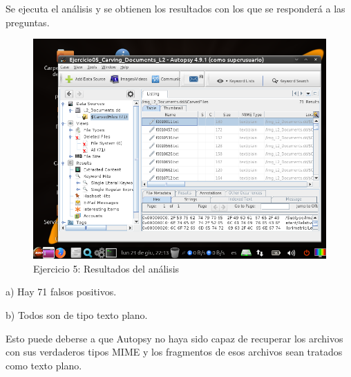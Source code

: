 \documentclass[11pt]{article}
\begin{document}
Se ejecuta el análisis y se obtienen los resultados con los que se responderá a las preguntas.

\begin{figure}[H]
    \caption{Ejercicio 5: Resultados del análisis}
    \centering
    \includegraphics[scale=0.7]{e5-5.png}
\end{figure}

a) Hay 71 falsos positivos.

b) Todos son de tipo texto plano.

Esto puede deberse a que Autopsy no haya sido capaz de recuperar los archivos con sus verdaderos tipos MIME y los fragmentos de esos archivos sean tratados como texto plano.



\begin{thebibliography}{8}
\end{thebibliography}
\end{document}
